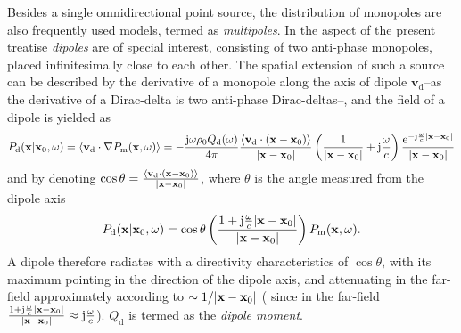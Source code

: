 \vspace{3mm}
Besides a single omnidirectional point source, the distribution of monopoles are also frequently used models, termed as \emph{multipoles}. In the aspect of the present treatise \emph{dipoles} are of special interest, consisting of two anti-phase monopoles, placed infinitesimally close to each other. The spatial extension of such a source can be described by the derivative of a monopole along the axis of dipole $\mathbf{v}_{\mathrm{d}}$--as the derivative of a Dirac-delta is two anti-phase Dirac-deltas--, and the field of a dipole is yielded as
\begin{equation}
P_{\mathrm{d}}(\mathbf{x}|\mathbf{x}_0,\omega) = \left< \mathbf{v}_{\mathrm{d}} \cdot \nabla P_{\mathrm{m}}(\mathbf{x},\omega) \right>= -\frac{\mathrm{j} \omega \rho_0 Q_\mathrm{d}(\omega)}{4\pi}\frac{\left<\mathbf{v}_{\mathrm{d}}\cdot (\mathbf{x}-\mathbf{x}_0) \right> } {|\mathbf{x}-\mathbf{x}_0|}\left(  \frac{1}{|\mathbf{x}-\mathbf{x}_0|} + \mathrm{j} \frac{\omega}{c} \right)\frac{\mathrm{e}^{-\mathrm{j} \frac{\omega}{c}|\mathbf{x}-\mathbf{x}_0|}}{|\mathbf{x}-\mathbf{x}_0|}
\end{equation}
and by denoting $\cos \theta = \frac{\left< \mathbf{v}_{\mathrm{d}}\cdot (\mathbf{x}-\mathbf{x}_0)  \right> } {|\mathbf{x}-\mathbf{x}_0|}$, where $\theta$ is the angle measured from the dipole axis 
\begin{equation}
P_{\mathrm{d}}(\mathbf{x}|\mathbf{x}_0,\omega) = \cos \theta \left( \frac{1 + \mathrm{j} \frac{\omega}{c}|\mathbf{x}-\mathbf{x}_0|}{|\mathbf{x}-\mathbf{x}_0|} \right) P_{\mathrm{m}} (\mathbf{x},\omega).
\end{equation}
A dipole therefore radiates with a directivity characteristics of $\cos \theta$, with its maximum pointing in the direction of the dipole axis, and attenuating in the far-field approximately according to $\sim 1/|\mathbf{x}-\mathbf{x}_0|$ ( since in the far-field $\frac{1 + \mathrm{j} \frac{\omega}{c}|\mathbf{x}-\mathbf{x}_0|}{|\mathbf{x}-\mathbf{x}_0|} \approx \mathrm{j} \frac{\omega}{c}$). $Q_{\mathrm{d}}$ is termed as the \emph{dipole moment}.
 
